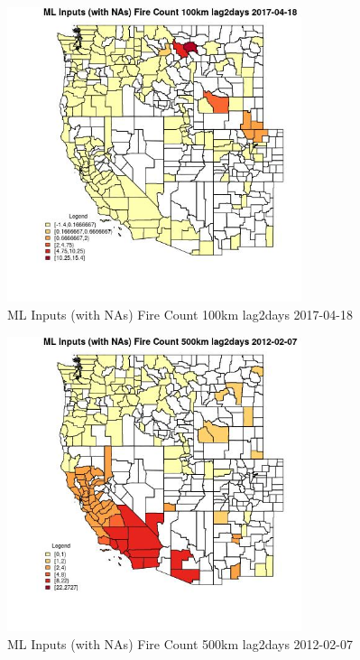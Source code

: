 \begin{figure} 
\centering  
\includegraphics[width=0.77\textwidth]{Code_Outputs/Report_ML_input_PM25_Step4_part_f_de_duplicated_aveswNAs_CountyFire_Count_100km_lag2daysMean2017-04-18.jpg} 
\caption{\label{fig:Report_ML_input_PM25_Step4_part_f_de_duplicated_aveswNAsCountyFire_Count_100km_lag2daysMean2017-04-18}ML Inputs (with NAs) Fire Count 100km lag2days 2017-04-18} 
\end{figure} 
 

\begin{figure} 
\centering  
\includegraphics[width=0.77\textwidth]{Code_Outputs/Report_ML_input_PM25_Step4_part_f_de_duplicated_aveswNAs_CountyFire_Count_500km_lag2daysMean2012-02-07.jpg} 
\caption{\label{fig:Report_ML_input_PM25_Step4_part_f_de_duplicated_aveswNAsCountyFire_Count_500km_lag2daysMean2012-02-07}ML Inputs (with NAs) Fire Count 500km lag2days 2012-02-07} 
\end{figure} 
 

